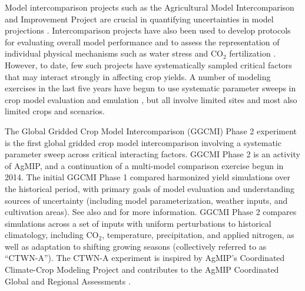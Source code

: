 \documentclass[gmd, manuscript]{copernicus} %
\begin{document}
Model intercomparison projects such as the Agricultural Model Intercomparison and Improvement Project \citep[AgMIP, ][]{ROSENZWEIG2013} are crucial in quantifying uncertainties in model projections \citep{Rosenzweig2014}. Intercomparison projects have also been used to develop protocols for evaluating overall model performance \citep{Elliott2015, muller_global_2017} and to assess the representation of individual physical mechanisms such as water stress and CO$_2$ fertilization \citep[e.g.][]{Schauberger2017}.
However, to date, few such projects have systematically sampled critical factors that may interact strongly in affecting crop yields. 
A number of modeling exercises in the last five years have begun to use systematic parameter sweeps in crop model evaluation and emulation \citep[e.g.][]{ruane2014, Markowski2015, Pirttioja2015,FRONZEK20182, Snyder2018, RUIZRAMOS2018}, but all involve limited sites and most also limited crops and scenarios. 

The Global Gridded Crop Model Intercomparison (GGCMI) Phase 2 experiment is the first global gridded crop model intercomparison involving a systematic parameter sweep across critical interacting factors.
GGCMI Phase 2 is an activity of AgMIP, and a continuation of a multi-model comparison exercise begun in 2014. 
The initial GGCMI Phase 1 \citep{Elliott2015, muller_global_2017} compared harmonized yield simulations over the historical period, with primary goals of model evaluation and understanding sources of uncertainty (including model parameterization, weather inputs, and cultivation areas). 
See also \citet{folberth2019} and  \citet{porwollik_spatial_2016} for more information. 
GGCMI Phase 2 compares simulations across a set of inputs with uniform perturbations to historical climatology,  
including CO$_2$, temperature, precipitation, and applied nitrogen, as well as adaptation to shifting growing seasons (collectively referred to as ``CTWN-A''). 
The CTWN-A experiment is inspired by AgMIP's Coordinated Climate-Crop Modeling Project \citep[C3MP, see][]{ruane2014, mcdermid2015agmip} and contributes to the AgMIP Coordinated Global and Regional Assessments \citep[CGRA, see][]{ruane2018, rosenzweig2018}. 
\end{document}
